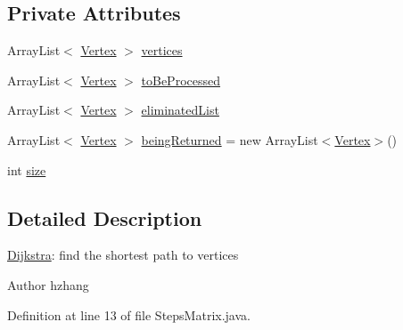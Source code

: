\subsection*{Private Attributes}
\begin{DoxyCompactItemize}
\item 
Array\-List$<$ \hyperlink{classmain_1_1java_1_1com_1_1company_1_1dijkstratest_1_1_vertex}{Vertex} $>$ \hyperlink{classmain_1_1java_1_1com_1_1company_1_1dijkstratest_1_1_steps_matrix_a1a3eb1ca85e39b9b704bfe7e26256afb}{vertices}
\item 
Array\-List$<$ \hyperlink{classmain_1_1java_1_1com_1_1company_1_1dijkstratest_1_1_vertex}{Vertex} $>$ \hyperlink{classmain_1_1java_1_1com_1_1company_1_1dijkstratest_1_1_steps_matrix_aa51c97e07faba7d835f614554810ab44}{to\-Be\-Processed}
\item 
Array\-List$<$ \hyperlink{classmain_1_1java_1_1com_1_1company_1_1dijkstratest_1_1_vertex}{Vertex} $>$ \hyperlink{classmain_1_1java_1_1com_1_1company_1_1dijkstratest_1_1_steps_matrix_af820b561be0222cbf21fd2a6134047b2}{eliminated\-List}
\item 
Array\-List$<$ \hyperlink{classmain_1_1java_1_1com_1_1company_1_1dijkstratest_1_1_vertex}{Vertex} $>$ \hyperlink{classmain_1_1java_1_1com_1_1company_1_1dijkstratest_1_1_steps_matrix_acb65a2ac68a2b40a4aca6fe2d9276f0d}{being\-Returned} = new Array\-List$<$\hyperlink{classmain_1_1java_1_1com_1_1company_1_1dijkstratest_1_1_vertex}{Vertex}$>$()
\item 
int \hyperlink{classmain_1_1java_1_1com_1_1company_1_1dijkstratest_1_1_steps_matrix_a9f574c424ce414987499434ed7311858}{size}
\end{DoxyCompactItemize}


\subsection{Detailed Description}
\hyperlink{class_dijkstra}{Dijkstra}\-: find the shortest path to vertices \begin{DoxyAuthor}{Author}
hzhang 
\end{DoxyAuthor}


Definition at line 13 of file Steps\-Matrix.\-java.



